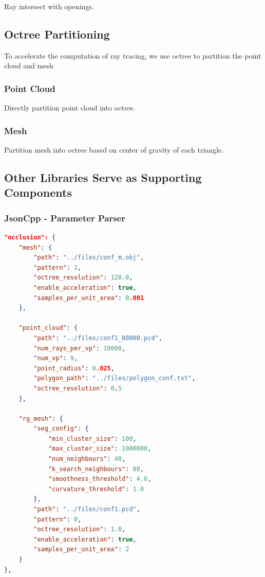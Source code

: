 \documentclass[11pt, a4paper,oneside,chapterprefix=false]{scrbook}
\begin{document}
Ray intersect with openings.

\subsection{Octree Partitioning}

To accelerate the computation of ray tracing, we use octree to partition the point cloud and mesh

\subsubsection{Point Cloud}

Directly partition point cloud into octree.

\subsubsection{Mesh}

Partition mesh into octree based on center of gravity of each triangle.

\subsection{Other Libraries Serve as Supporting Components} \label{sec:supporting libraries}

\subsubsection{JsonCpp - Parameter Parser} \label{subsec:jsoncpp}

\begin{lstlisting}[language=json, caption=Json Configuration File]
"occlusion": {
	"mesh": {
		"path": "../files/conf_m.obj",
		"pattern": 1,
		"octree_resolution": 128.0,
		"enable_acceleration": true,
		"samples_per_unit_area": 0.001
	},

	"point_cloud": {
		"path": "../files/conf1_80000.pcd",
		"num_rays_per_vp": 10000, 
		"num_vp": 9, 
		"point_radius": 0.025,
		"polygon_path": "../files/polygon_conf.txt",
		"octree_resolution": 0.5
	},

	"rg_mesh": {
		"seg_config": {
			"min_cluster_size": 100,
			"max_cluster_size": 1000000,
			"num_neighbours": 40,
			"k_search_neighbours": 80,
			"smoothness_threshold": 4.0,
			"curvature_threshold": 1.0
		},
		"path": "../files/conf1.pcd",
		"pattern": 0,
		"octree_resolution": 1.0,
		"enable_acceleration": true,
		"samples_per_unit_area": 2
	}
},
\end{lstlisting}
\end{document}
